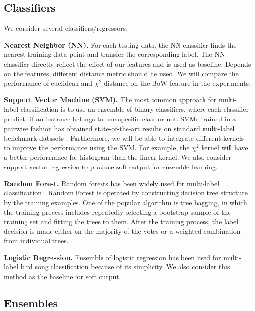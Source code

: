 \documentclass{article} %
\begin{document}
\subsection{Classifiers}
We consider several classifiers/regressors.

\textbf{Nearest Neighbor (NN).} For each testing data, the NN classifier finds the nearest training data point and transfer the corresponding label. The NN classifier directly reflect the effect of our features and is used as baseline. Depends on the features, different distance metric should be used. We will compare the performance of euclidean and $\chi^2$ distance on the BoW feature in the experiments.

\textbf{Support Vector Machine (SVM).} The most common approach for multi-label classification is to use an ensemble of binary classifiers, where each classifier predicts if an instance belongs to
one specific class or not. SVMs trained in a pairwise fashion has obtained state-of-the-art results on standard multi-label benchmark datasets \cite{Mencia_NIPSW13}. Furthermore, we will be able to integrate different kernels to improve the performance using the SVM. For example, the $\chi^2$ kernel will have a better performance for histogram than the linear kernel. We also consider support vector regression to produce soft output for ensemble learning.


\textbf{Random Forest.} Random forests has been widely used for multi-label classification \cite{Lasseck13, chennovel13, Stowell_NIPSW13, Zhang_SDM2010}.
Random Forest is operated by constructing decision tree structure by the training examples. One of the popular algorithm is tree bagging, in which the training process includes repeatedly selecting a bootstrap sample of the training set and  fitting the trees to them. After the training process, the label decision is made either on the majority of the votes or a weighted combination from individual trees.


\textbf{Logistic Regression.} Ensemble of logistic regression has been used for multi-label bird song classification \cite{Massaron13} because of its simplicity. We also consider this method as the baseline for soft output.

\subsection{Ensembles}
\end{document}
